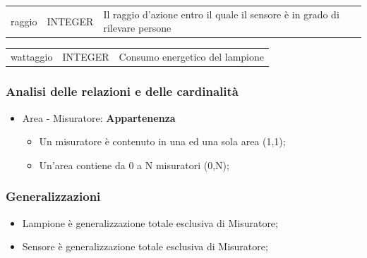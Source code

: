 \begin{center}
    \begin{tabularx}{\textwidth}{|l|l|X}
        \hline
        \rowcolor{gray!30}
        \multicolumn{3}{|c|}{\textbf{SENSORE}}\\
        \hline
        raggio & INTEGER & Il raggio d'azione entro il quale il sensore è in grado di rilevare persone \\
        \hline
    \end{tabularx}
\end{center}

\begin{center}
    \begin{tabularx}{\textwidth}{|l|l|X|}
        \hline
        \rowcolor{gray!30}
        \multicolumn{3}{|c|}{\textbf{LAMPIONE}}\\
        \hline
        wattaggio & INTEGER & Consumo energetico del lampione \\
        \hline
    \end{tabularx}
\end{center}

\subsubsection{Analisi delle relazioni e delle cardinalità}

\begin{itemize}

    \item Area - Misuratore: \textbf{Appartenenza}
    \begin{itemize}
        \item Un misuratore è contenuto in una ed una sola area (1,1);
        \item Un'area contiene da 0 a N misuratori (0,N);
    \end{itemize}
    
\end{itemize}

\subsubsection{Generalizzazioni}

\begin{itemize}
    \item Lampione è generalizzazione totale esclusiva di Misuratore;
    \item Sensore è generalizzazione totale esclusiva di Misuratore;
\end{itemize}

